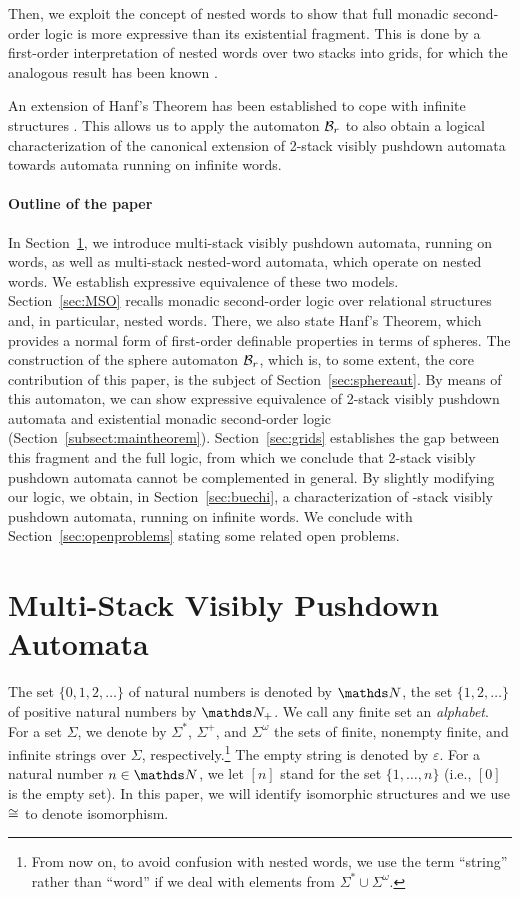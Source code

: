 \documentclass{LMCS}
\begin{document}
Then, we exploit the concept of nested words to show that full monadic
second-order logic is more expressive than its existential fragment. This is
done by a first-order interpretation of nested words over two stacks into
grids, for which the analogous result has been known \cite{MST02}.

An extension of Hanf's Theorem has been established to cope with infinite
structures \cite{LSV:06:11}. This allows us to apply the automaton
$\mathcal{B}_r$ to also obtain a logical characterization of the canonical
extension of 2-stack visibly pushdown automata towards \Buchi automata running
on infinite words.

\paragraph{Outline of the paper} In Section~\ref{sec:MVPA}, we introduce
multi-stack visibly pushdown automata, running on words, as well as
multi-stack nested-word automata, which operate on nested words. We establish
expressive equivalence of these two models. Section~\ref{sec:MSO} recalls
monadic second-order logic over relational structures and, in particular,
nested words. There, we also state Hanf's Theorem, which provides a normal
form of first-order definable properties in terms of spheres. The construction
of the sphere automaton $\mathcal{B}_r$, which is, to some extent, the core
contribution of this paper, is the subject of Section~\ref{sec:sphereaut}. By
means of this automaton, we can show expressive equivalence of 2-stack visibly
pushdown automata and existential monadic second-order logic
(Section~\ref{subsect:maintheorem}). Section~\ref{sec:grids} establishes the
gap between this fragment and the full logic, from which we conclude that
2-stack visibly pushdown automata cannot be complemented in general. By
slightly modifying our logic, we obtain, in Section~\ref{sec:buechi}, a
characterization of -stack visibly pushdown automata, running on
infinite words. We conclude with Section~\ref{sec:openproblems} stating some
related open problems.




\section{Multi-Stack Visibly Pushdown Automata}\label{sec:MVPA}

The set $\{0,1,2,\ldots\}$ of natural numbers is denoted by $\N$, the set
$\{1,2,\ldots\}$ of positive natural numbers by $\infDom$. We call any finite
set an \emph{alphabet}. For a set $\Sigma$, we denote by $\Sigma^\ast$,
$\Sigma^+$, and $\Sigma^\omega$ the sets of finite, nonempty finite, and
infinite strings over $\Sigma$, respectively.\footnote{From now on, to avoid
  confusion with nested words, we use the term ``string'' rather than ``word''
  if we deal with elements from $\Sigma^\ast \cup \Sigma^\omega$.} The empty
string is denoted by $\varepsilon$. For a natural number $n \in \N$, we let
$[n]$ stand for the set $\{1,\ldots,n\}$ (i.e., $[0]$ is the empty set). In
this paper, we will identify isomorphic structures and we use $\cong$ to
denote isomorphism.
\end{document}
